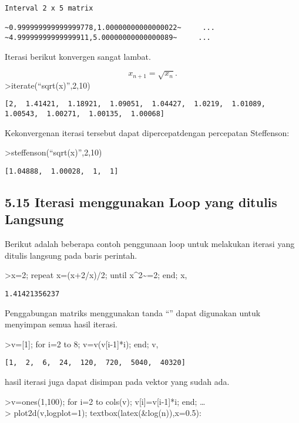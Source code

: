 \documentclass[
]{book}
\begin{document}
\begin{verbatim}
Interval 2 x 5 matrix

~0.999999999999999778,1.00000000000000022~     ...
~4.99999999999999911,5.00000000000000089~     ...
\end{verbatim}

Iterasi berikut konvergen sangat lambat.

\[x_{n+1} = \sqrt{x_n}.\]\textgreater iterate(``sqrt(x)'',2,10)

\begin{verbatim}
[2,  1.41421,  1.18921,  1.09051,  1.04427,  1.0219,  1.01089,
1.00543,  1.00271,  1.00135,  1.00068]
\end{verbatim}

Kekonvergenan iterasi tersebut dapat dipercepatdengan percepatan Steffenson:

\textgreater steffenson(``sqrt(x)'',2,10)

\begin{verbatim}
[1.04888,  1.00028,  1,  1]
\end{verbatim}

\subsection{5.15 Iterasi menggunakan Loop yang ditulis Langsung}\label{iterasi-menggunakan-loop-yang-ditulis-langsung}

Berikut adalah beberapa contoh penggunaan loop untuk melakukan iterasi yang ditulis langsung pada baris perintah.

\textgreater x=2; repeat x=(x+2/x)/2; until x\^{}2\textasciitilde=2; end; x,

\begin{verbatim}
1.41421356237
\end{verbatim}

Penggabungan matriks menggunakan tanda ``\textbar{}'' dapat digunakan untuk menyimpan semua hasil iterasi.

\textgreater v={[}1{]}; for i=2 to 8; v=v\textbar(v{[}i-1{]}*i); end; v,

\begin{verbatim}
[1,  2,  6,  24,  120,  720,  5040,  40320]
\end{verbatim}

hasil iterasi juga dapat disimpan pada vektor yang sudah ada.

\textgreater v=ones(1,100); for i=2 to cols(v); v{[}i{]}=v{[}i-1{]}*i; end; \ldots{}\\
\textgreater{} plot2d(v,logplot=1); textbox(latex(\&log(n)),x=0.5):
\end{document}
